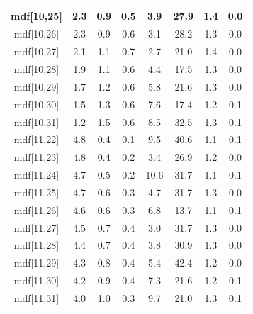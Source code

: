 \begin{longtable}{|c|c|c|c|c|c|c|c|}
\hline
mdf[10,25] & 2.3 & 0.9 & 0.5 & 3.9 & 27.9 & 1.4 & 0.0 \\
\hline
mdf[10,26] & 2.3 & 0.9 & 0.6 & 3.1 & 28.2 & 1.3 & 0.0 \\
\hline
mdf[10,27] & 2.1 & 1.1 & 0.7 & 2.7 & 21.0 & 1.4 & 0.0 \\
\hline
mdf[10,28] & 1.9 & 1.1 & 0.6 & 4.4 & 17.5 & 1.3 & 0.0 \\
\hline
mdf[10,29] & 1.7 & 1.2 & 0.6 & 5.8 & 21.6 & 1.3 & 0.0 \\
\hline
mdf[10,30] & 1.5 & 1.3 & 0.6 & 7.6 & 17.4 & 1.2 & 0.1 \\
\hline
mdf[10,31] & 1.2 & 1.5 & 0.6 & 8.5 & 32.5 & 1.3 & 0.1 \\
\hline
mdf[11,22] & 4.8 & 0.4 & 0.1 & 9.5 & 40.6 & 1.1 & 0.1 \\
\hline
mdf[11,23] & 4.8 & 0.4 & 0.2 & 3.4 & 26.9 & 1.2 & 0.0 \\
\hline
mdf[11,24] & 4.7 & 0.5 & 0.2 & 10.6 & 31.7 & 1.1 & 0.1 \\
\hline
mdf[11,25] & 4.7 & 0.6 & 0.3 & 4.7 & 31.7 & 1.3 & 0.0 \\
\hline
mdf[11,26] & 4.6 & 0.6 & 0.3 & 6.8 & 13.7 & 1.1 & 0.1 \\
\hline
mdf[11,27] & 4.5 & 0.7 & 0.4 & 3.0 & 31.7 & 1.3 & 0.0 \\
\hline
mdf[11,28] & 4.4 & 0.7 & 0.4 & 3.8 & 30.9 & 1.3 & 0.0 \\
\hline
mdf[11,29] & 4.3 & 0.8 & 0.4 & 5.4 & 42.4 & 1.2 & 0.0 \\
\hline
mdf[11,30] & 4.2 & 0.9 & 0.4 & 7.3 & 21.6 & 1.2 & 0.1 \\
\hline
mdf[11,31] & 4.0 & 1.0 & 0.3 & 9.7 & 21.0 & 1.3 & 0.1 \\
\hline
\end{longtable}
